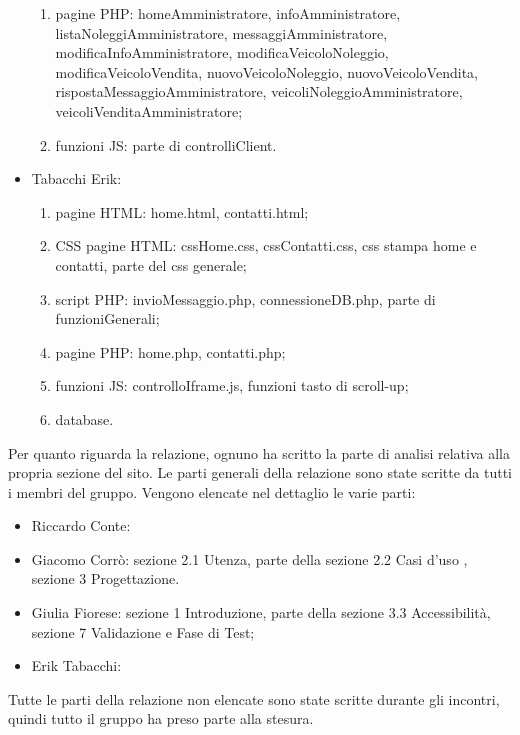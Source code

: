 \begin{itemize}
\begin{enumerate}
            \item pagine PHP: homeAmministratore, infoAmministratore, listaNoleggiAmministratore, messaggiAmministratore, modificaInfoAmministratore, modificaVeicoloNoleggio, modificaVeicoloVendita, nuovoVeicoloNoleggio, nuovoVeicoloVendita, rispostaMessaggioAmministratore, veicoliNoleggioAmministratore, veicoliVenditaAmministratore;
            \item funzioni JS: parte di controlliClient.
        \end{enumerate}
    \item Tabacchi Erik:
        \begin{enumerate}
            \item pagine HTML: home.html, contatti.html;
            \item CSS pagine HTML: cssHome.css, cssContatti.css, css stampa home e contatti, parte del css generale;
            \item script PHP: invioMessaggio.php, connessioneDB.php, parte di funzioniGenerali;
            \item pagine PHP: home.php, contatti.php;
            \item funzioni JS: controlloIframe.js, funzioni tasto di scroll-up;
            \item database.
        \end{enumerate}
\end{itemize}
Per quanto riguarda la relazione, ognuno ha scritto la parte di analisi relativa alla propria sezione del sito. Le parti generali della relazione sono state scritte da tutti i membri del gruppo.
Vengono elencate nel dettaglio le varie parti:
\begin{itemize}
    \item Riccardo Conte:
    \item Giacomo Corrò: sezione 2.1 Utenza, parte della sezione 2.2 Casi d'uso , sezione 3 Progettazione.
    \item Giulia Fiorese: sezione 1 Introduzione, parte della sezione 3.3 Accessibilità, sezione 7 Validazione e Fase di Test;
    \item Erik Tabacchi:
\end{itemize}
Tutte le parti della relazione non elencate sono state scritte durante gli incontri, quindi tutto il gruppo ha preso parte alla stesura.
\pagebreak
